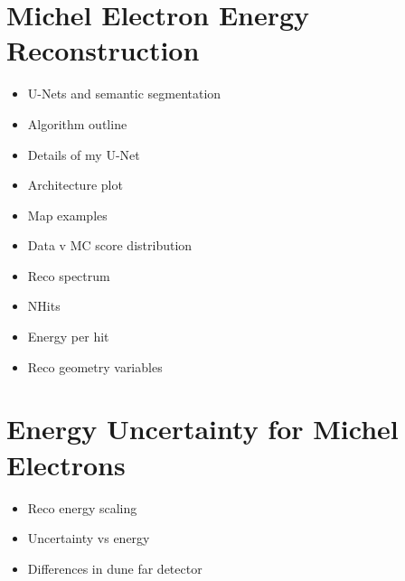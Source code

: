 
\section{Michel Electron Energy Reconstruction} \label{ME_R} 
\begin{mccorrection}
	\begin{itemize} 
	\item U-Nets and semantic segmentation
	\item Algorithm outline
	\item Details of my U-Net
	\item Architecture plot
	\item Map examples
	\item Data v MC score distribution
	\item Reco spectrum
	\item NHits
	\item Energy per hit
	\item Reco geometry variables
	\end{itemize}
\end{mccorrection}

\section{Energy Uncertainty for Michel Electrons} \label{ME_EU}
\begin{mccorrection}
	\begin{itemize}
	\item Reco energy scaling
	\item Uncertainty vs energy
	\item Differences in dune far detector
	\end{itemize}
\end{mccorrection}
